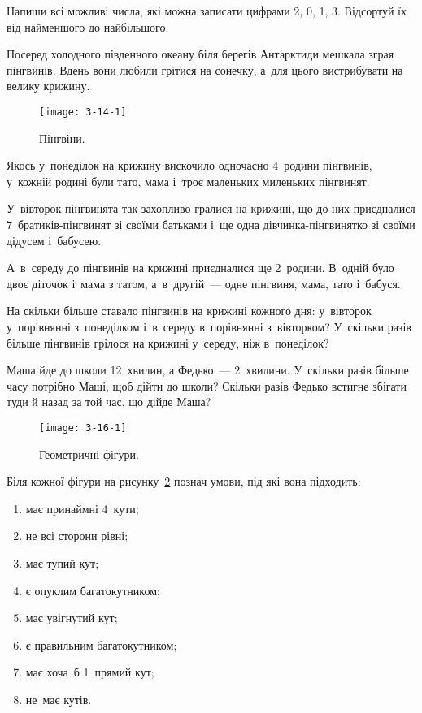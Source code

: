 \problem
Напиши всі можливі числа, які можна записати цифрами 2, 0, 1, 3.
Відсортуй їх від найменшого до найбільшого.


\problem
Посеред холодного південного океану біля берегів Антарктиди мешкала
зграя пінгвинів. Вдень вони любили грітися на сонечку, а~для цього
вистрибувати на велику крижину.

\begin{figure}[ht]
  \centering
  \texttt{[image: 3-14-1]}
  \caption{Пінгвіни.}
  \label{fig:penguins}
\end{figure}

Якось у~понеділок на крижину вискочило одночасно 4~родини пінгвинів,
у~кожній родині були тато, мама і~троє маленьких миленьких пінгвинят.

У~вівторок пінгвинята так захопливо гралися на крижині,
що до них приєдналися 7~братиків-пінгвинят зі своїми батьками
і~ще одна дівчинка-пінгвинятко зі своїми дідусем і~бабусею.

А~в~середу до пінгвинів на крижині приєдналися ще 2~родини.
В~одній було двоє діточок і~мама з татом, а~в~другій~---
одне пінгвиня, мама, тато і~бабуся.

На скільки більше ставало пінгвинів на крижині кожного дня:
у~вівторок у~порівнянні з~понеділком і~в~середу в~порівнянні з~вівторком?
У~скільки разів більше пінгвинів грілося на крижині у~середу, ніж в~понеділок?


\problem
Маша йде до школи 12~хвилин, а Федько~--- 2~хвилини.
У~скільки разів більше часу потрібно Маші, щоб дійти до школи?
Скільки разів Федько встигне збігати туди й назад за той час, що дійде Маша?


\problem
{}

\begin{figure}[ht]
  \centering
  \texttt{[image: 3-16-1]}
  \caption{Геометричні фігури.}
  \label{fig:geom-figures-recognition}
\end{figure}

Біля кожної фігури на рисунку~\ref{fig:geom-figures-recognition} познач умови,
під які вона підходить:
\begin{enumerate}
  \item має принаймні 4~кути;
  \item не всі сторони рівні;
  \item має тупий кут;
  \item є опуклим багатокутником;
  \item має увігнутий кут;
  \item є правильним багатокутником;
  \item має хоча~б 1~прямий кут;
  \item не~має кутів.
\end{enumerate}


